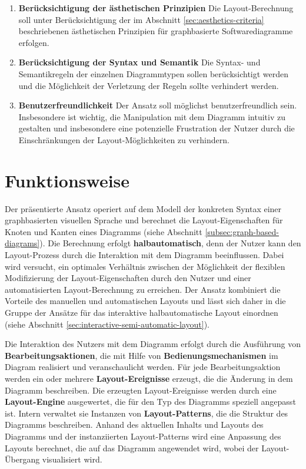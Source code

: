 \begin{enumerate}[label={K.\arabic*}]
    \item \label{req:aesthetics-criteria} \textbf{Berücksichtigung der ästhetischen Prinzipien} Die Layout-Berechnung soll unter Berücksichtigung der im Abschnitt \ref{sec:aesthetics-criteria} beschriebenen ästhetischen Prinzipien für graphbasierte Softwarediagramme erfolgen.
    \item \label{req:syntax-and-semantics} \textbf{Berücksichtigung der Syntax und Semantik} Die Syntax- und Semantikregeln der einzelnen Diagrammtypen sollen berücksichtigt werden und die Möglichkeit der Verletzung der Regeln sollte verhindert werden.
    \item \label{req:user-friendly} \textbf{Benutzerfreundlichkeit} Der Ansatz soll möglichst benutzerfreundlich sein. Insbesondere ist wichtig, die Manipulation mit dem Diagramm intuitiv zu gestalten und insbesondere eine potenzielle Frustration der Nutzer durch die Einschränkungen der Layout-Möglichkeiten zu verhindern.
\end{enumerate}


\section{Funktionsweise}
\label{sec:functionality}

Der präsentierte Ansatz operiert auf dem Modell der konkreten Syntax einer graphbasierten visuellen Sprache und berechnet die Layout-Eigenschaften für Knoten und Kanten eines Diagramms (siehe Abschnitt \ref{subsec:graph-based-diagrams}). Die Berechnung erfolgt \textbf{halbautomatisch}, denn der Nutzer kann den Layout-Prozess durch die Interaktion mit dem Diagramm beeinflussen. Dabei wird versucht, ein optimales Verhältnis zwischen der Möglichkeit der flexiblen Modifizierung der Layout-Eigenschaften durch den Nutzer und einer automatisierten Layout-Berechnung zu erreichen. Der Ansatz kombiniert die Vorteile des manuellen und automatischen Layouts und lässt sich daher in die Gruppe der Ansätze für das interaktive halbautomatische Layout einordnen (siehe Abschnitt \ref{sec:interactive-semi-automatic-layout}).

Die Interaktion des Nutzers mit dem Diagramm erfolgt durch die Ausführung von \textbf{Bearbeitungsaktionen}, die mit Hilfe von \textbf{Bedienungsmechanismen} im Diagram realisiert und veranschaulicht werden. Für jede Bearbeitungsaktion werden ein oder mehrere \textbf{Layout-Ereignisse} erzeugt, die die Änderung in dem Diagramm beschreiben. Die erzeugten Layout-Ereignisse werden durch eine \textbf{Layout-Engine} ausgewertet, die für den Typ des Diagramms speziell angepasst ist. Intern verwaltet sie Instanzen von \textbf{Layout-Patterns}, die die Struktur des Diagramms beschreiben. Anhand des aktuellen Inhalts und Layouts des Diagramms und der instanziierten Layout-Patterns wird eine Anpassung des Layouts berechnet, die auf das Diagramm angewendet wird, wobei der Layout-Übergang visualisiert wird.

